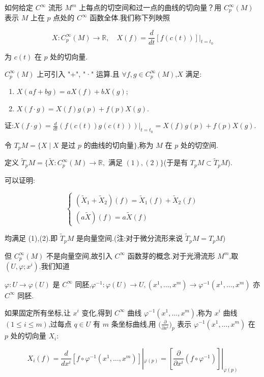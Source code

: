 如何给定 $C^\infty$ 流形 $M^m$ 上每点的切空间和过一点的曲线的切向量？用 $C_p^\infty(M)$ 表示 $M$ 上在 $p$ 点处的 $C^\infty$ 函数全体.我们称下列映照

\[
X : C_p^\infty(M) \rightarrow \mathbb{R}, \quad X(f) = \frac{d}{dt}[f(c(t))]|_{t=t_0}
\]

为 $c(t)$ 在 $p$ 处的切向量.

$C_p^\infty(M)$ 上可引入 "+", "·" 运算.且 $\forall f, g \in C_p^\infty(M)$,$X$ 满足:
\begin{enumerate}
    \item $X(a f + b g) = a X(f) + b X(g)$;
    \item $X(f \cdot g) = X(f)g(p) + f(p)X(g)$.
\end{enumerate}

证:$X(f \cdot g) = \frac{d}{dt}(f(c(t))g(c(t))) |_{t=t_0} = X(f)g(p) + f(p)X(g)$.

令 $T_p M = \{X \mid X \text{ 是过 } p \text{ 的曲线的切向量}\}$,称为 $M$ 在 $p$ 处的切空间.

定义 $\tilde{T}_p M = \{ \tilde{X} : C_p^\infty(M) \rightarrow \mathbb{R}, \text{ 满足 } (1),(2)\}$(于是有 $T_p M \subset \tilde{T}_p M$).

可以证明:

\[
\begin{cases}
(\tilde{X}_1 + \tilde{X}_2)(f) = \tilde{X}_1(f) + \tilde{X}_2(f) \\
(a \tilde{X})(f) = a \tilde{X}(f)
\end{cases}
\]

均满足 (1),(2).即 $\tilde{T}_p M$ 是向量空间.(注:对于微分流形来说 $\tilde{T}_p M = T_p M$)

但 $C_p^\infty(M)$ 不是向量空间,故引入 $C^\infty$ 函数芽的概念.对于光滑流形 $M^m$,取 $(U, \varphi; x^i)$.我们知道

$\varphi: U \rightarrow \varphi(U)$ 是 $C^\infty$ 同胚,$\varphi^{-1} : \varphi(U) \rightarrow U, (x^1, \ldots, x^m) \rightarrow \varphi^{-1}(x^1, \ldots, x^m)$ 亦 $C^\infty$ 同胚.

如果固定所有坐标,让 $x^i$ 变化,得到 $C^\infty$ 曲线 $\varphi^{-1}(x^1, \ldots, x^m)$,称为 $x^i$ 曲线 $(1 \leq i \leq m)$,过每点 $q \in U$ 有 $m$ 条坐标曲线,用 $\big(\frac{\partial}{\partial x^i}\big)_p$ 表示 $\varphi^{-1}(x^1, \ldots, x^m)$ 在 $p$ 处的切向量 $X_i$:

\[
X_i(f) = \frac{d}{dx^i}[f \circ \varphi^{-1}(x^1, \ldots, x^m)]|_{\varphi(p)} = \left[\frac{\partial}{\partial x^i}(f \circ \varphi^{-1})\right]|_{\varphi(p)}
\]

